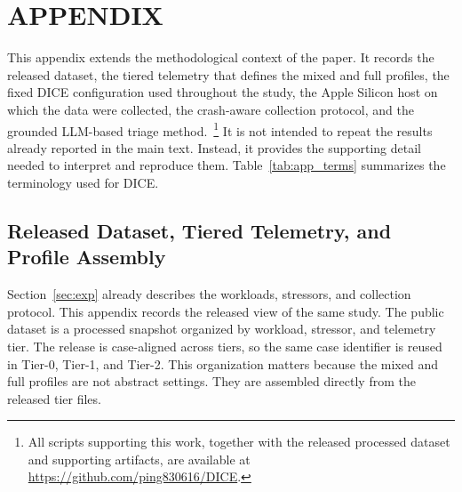 
\clearpage
\FloatBarrier
\section*{APPENDIX}
\label{app:appendix}
\thispagestyle{plain}

\setcounter{subsection}{0}
\setcounter{figure}{0}
\setcounter{table}{0}
\renewcommand{\thesubsection}{\Alph{subsection}}
\renewcommand{\thefigure}{A-\arabic{figure}}
\renewcommand{\thetable}{A-\Roman{table}}

\flushbottom
\setlength{\textfloatsep}{2pt plus 1pt minus 1pt}
\setlength{\floatsep}{2pt plus 1pt minus 1pt}
\setlength{\intextsep}{2pt plus 1pt minus 1pt}
\setlength{\dbltextfloatsep}{2pt plus 1pt minus 1pt}
\setlength{\dblfloatsep}{2pt plus 1pt minus 1pt}
\setlength{\abovecaptionskip}{2pt}
\setlength{\belowcaptionskip}{0pt}

This appendix extends the methodological context of the paper. It records the released dataset, the tiered telemetry that defines the mixed and full profiles, the fixed \textsc{DICE} configuration used throughout the study, the Apple Silicon host on which the data were collected, the crash-aware collection protocol, and the grounded LLM-based triage method.~\footnote{All scripts supporting this work, together with the released processed dataset and supporting artifacts, are available at \url{https://github.com/ping830616/DICE}.} It is not intended to repeat the results already reported in the main text. Instead, it provides the supporting detail needed to interpret and reproduce them. Table~\ref{tab:app_terms} summarizes the terminology used for \textsc{DICE}.

\subsection{Released Dataset, Tiered Telemetry, and Profile Assembly}\label{app:data_release}

Section~\ref{sec:exp} already describes the workloads, stressors, and collection protocol. This appendix records the released view of the same study. The public dataset is a processed snapshot organized by workload, stressor, and telemetry tier. The release is case-aligned across tiers, so the same case identifier is reused in Tier-0, Tier-1, and Tier-2. This organization matters because the mixed and full profiles are not abstract settings. They are assembled directly from the released tier files.

